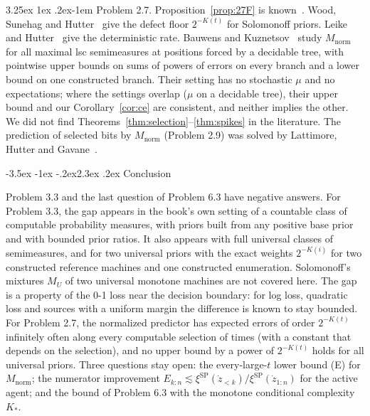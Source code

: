 \documentclass[11pt]{article}
\makeatletter
\renewcommand\section{\@startsection{section}{1}{\z@}%
  {-3.5ex \@plus -1ex \@minus -.2ex}{2.3ex \@plus.2ex}%
  {\normalfont\Large\bfseries\boldmath}}
\renewcommand\paragraph{\@startsection{paragraph}{4}{\z@}%
  {3.25ex \@plus1ex \@minus.2ex}{-1em}%
  {\normalfont\normalsize\bfseries\boldmath}}
\newcommand{\Mnorm}{M_{\mathrm{norm}}}
\newcommand{\SP}{\mathrm{SP}}
\theoremstyle{definition}
\theoremstyle{remark}
\makeatother
\begin{document}
\paragraph{Problem 2.7.}
Proposition~\ref{prop:27F} is known~\cite{hutter2007bayesconf}. Wood, Sunehag
and Hutter~\cite[Lemma~15]{woodsunehaghutter2013} give the defect floor
$2^{-K(t)}$ for Solomonoff priors. Leike and Hutter~\cite{leikehutter2015nicod}
give the deterministic rate. Bauwens and Kuznetsov~\cite{bauwenskuznetsov2026}
study $\Mnorm$ for all maximal lsc semimeasures at positions forced by a
decidable tree, with pointwise upper bounds on sums of powers of errors on every
branch and a lower bound on one constructed branch. Their setting has no
stochastic $\mu$ and no expectations; where the settings overlap ($\mu$ on a
decidable tree), their upper bound and our Corollary~\ref{cor:ce} are consistent, and
neither implies the other. We did not find
Theorems~\ref{thm:selection}--\ref{thm:spikes} in the literature. The prediction
of selected bits by $\Mnorm$ (Problem 2.9) was solved by Lattimore, Hutter and
Gavane~\cite{lattimorehuttergavane2011}.

\section{Conclusion}

Problem 3.3 and the last question of Problem 6.3 have negative answers.
For Problem 3.3, the gap appears in the book's own setting of a countable
class of computable probability measures, with priors built from any positive
base prior and with bounded prior ratios. It also appears with full universal classes of
semimeasures, and for two universal priors with the exact weights $2^{-K(i)}$
for two constructed reference machines and one constructed enumeration. Solomonoff's mixtures $M_U$ of two
universal monotone machines are not covered here. The gap is a property
of the 0-1 loss near the decision boundary: for log loss, quadratic loss and
sources with a uniform margin the difference is known to stay bounded. For Problem 2.7, the normalized predictor has expected errors of
order $2^{-K(t)}$ infinitely often along every computable selection of times
(with a constant that depends on the selection), and no
upper bound by a power of $2^{-K(t)}$ holds for all universal priors. Three
questions stay open: the every-large-$t$ lower bound (E) for $\Mnorm$; the
numerator improvement $E_{k:n}\lesssim\xi^{\SP}(\dot z_{<k})/\xi^{\SP}(\dot z_{1:n})$
for the active agent; and the bound of Problem 6.3 with the monotone conditional
complexity $K_*$.
\end{document}
